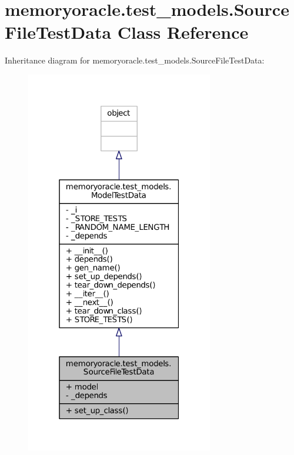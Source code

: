 \hypertarget{classmemoryoracle_1_1test__models_1_1SourceFileTestData}{}\section{memoryoracle.\+test\+\_\+models.\+Source\+File\+Test\+Data Class Reference}
\label{classmemoryoracle_1_1test__models_1_1SourceFileTestData}


Inheritance diagram for memoryoracle.\+test\+\_\+models.\+Source\+File\+Test\+Data\+:\nopagebreak
\begin{figure}[H]
\begin{center}
\leavevmode
\includegraphics[width=232pt]{classmemoryoracle_1_1test__models_1_1SourceFileTestData__inherit__graph}
\end{center}
\end{figure}


